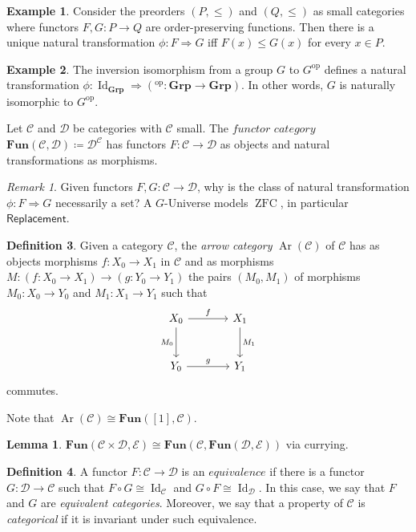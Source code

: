 \documentclass[10pt,letterpaper,cm]{nupset}
\theoremstyle{definition}
\newtheorem{definition}{Definition}
\newtheorem{exmp}[definition]{Example}
\theoremstyle{theorem}
\newtheorem{lemma}[theorem]{Lemma}
\theoremstyle{remark}
\newtheorem{remark}{Remark}
\newcommand{\1}{\mathbf{1}}
\renewcommand{\c}{\mathscr{C}}
\renewcommand{\d}{\mathscr{D}}
\newcommand{\e}{\mathscr{E}}
\newcommand{\0}{\vec 0}
\DeclareMathOperator{\id}{Id}
\DeclareMathOperator{\op}{op}
\DeclareMathOperator{\ar}{Ar}
\DeclareMathOperator{\ZFC}{ZFC}
\begin{document}
\begin{exmp}
Consider the preorders $(P, \leq)$ and $(Q, \leq)$ as small categories where functors $F, G: P \to Q$ are order-preserving functions. Then there is a unique natural transformation $\phi: F \Rightarrow G$ iff $F(x) \leq G(x)$ for every $x\in P$.
\end{exmp}

\begin{exmp}\label{grp}
The inversion isomorphism from a group $G$ to $G^{\op}$ defines a natural transformation $\phi: \id_{\mathbf{Grp}} \Rightarrow \left(^{\op}: \mathbf{Grp} \to \mathbf{Grp}\right)$. In other words, $G$ is naturally isomorphic to $G^{\op}$.
\end{exmp}

\smallskip

Let $\c$ and $\d$ be categories with $\c$ small. The $\textit{functor category}$ $\mathbf{Fun}(\c, \d)\coloneqq \d^\c$ has functors $F: \c \to \d$ as objects and natural transformations as morphisms. 


\begin{remark}
Given functors $F, G: \c \to \d$, why is the class of natural transformation $\phi: F \Rightarrow G$ necessarily a set?
A $G$-Universe models $\ZFC$, in particular $\mathsf{Replacement}$.
\end{remark}

\begin{definition}
Given a category $\c$, the \textit{arrow category} $\ar(\c)$ of $\c$ has as objects morphisms $f: X_0 \to X_1$ in $\c$ and as morphisms $M: \left(f: X_0 \to X_1\right) \to \left(g: Y_0 \to Y_1\right)$ the pairs $\left(M_0, M_1\right)$ of morphisms $M_0 : X_0 \to Y_0$ and $M_1 : X_1 \to Y_1$ such that
\[
\begin{tikzcd}[row sep=large, column sep = large]
X_0 \arrow[r, "f"] \arrow[d, "M_0", swap]
& X_1 \arrow[d, "M_1"] \\
Y_0 \arrow[r, "g"]
& Y_1
\end{tikzcd}
\]
commutes. 
\end{definition}

Note that $\ar(\c) \cong \mathbf{Fun}([1], \c)$.

\begin{lemma}
$\mathbf{Fun}(\c \times \d, \e) \cong \mathbf{Fun}(\c, \mathbf{Fun}( \d, \e))$ via currying. 
\end{lemma}

\begin{definition}
A functor $F: \c \to \d$ is an $\textit{equivalence}$ if there is a functor $G: \d \to \c$ such that $F \circ G \cong \id_{\c}$ and $G \circ F \cong \id_{\d}$. In this case, we say that $F$ and $G$ are \textit{equivalent categories}. Moreover, we say that a property of $\c$ is \textit{categorical} if it is invariant under such equivalence.
\end{definition}
\end{document}
